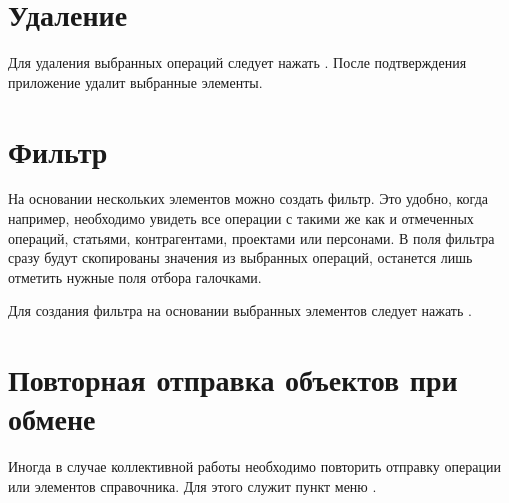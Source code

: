 \documentclass[a4paper,10pt,russian]{sphinxmanual}
\begin{document}
\noindent{}

\noindent{}


\section{Удаление}
\label{\detokenize{bulk-actions:id4}}
\sphinxAtStartPar
Для удаления выбранных операций следует нажать . После подтверждения приложение удалит выбранные элементы.

\noindent{}

\noindent{}


\section{Фильтр}
\label{\detokenize{bulk-actions:id5}}
\sphinxAtStartPar
На основании нескольких элементов можно создать фильтр. Это удобно, когда например, необходимо увидеть все операции с
такими же как и отмеченных операций, статьями, контрагентами, проектами или персонами. В поля фильтра сразу будут скопированы
значения из выбранных операций, останется лишь отметить нужные поля отбора галочками.

\sphinxAtStartPar
Для создания фильтра на основании выбранных элементов следует нажать .

\noindent{}

\noindent{}


\section{Повторная отправка объектов при обмене}
\label{\detokenize{bulk-actions:id6}}
\sphinxAtStartPar
Иногда в случае коллективной работы необходимо повторить отправку операции или элементов справочника. Для этого служит
пункт меню .

\noindent{}
\end{document}
